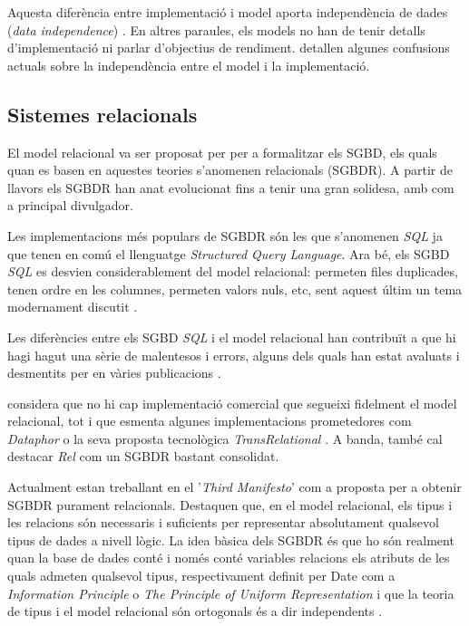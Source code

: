 Aquesta diferència entre implementació i model aporta independència de dades (\emph{data independence}) \parencite{date:dictionary}. En altres paraules, els models no han de tenir detalls d'implementació ni parlar d'objectius de rendiment. 
\textcite{dbdebunk} detallen algunes confusions actuals sobre la independència entre el model i la implementació.







\subsection{Sistemes relacionals}

El model relacional va ser proposat per \textcite{codd70} per a
formalitzar els SGBD, els quals quan es basen en aquestes teories
s'anomenen relacionals (SGBDR). A partir de llavors els SGBDR han anat
evolucionat fins a tenir una gran solidesa, amb
\textcite{date:introduction,date06,date:dictionary} com a principal
divulgador.



Les implementacions més populars de SGBDR són les que s'anomenen
\emph{SQL} ja que tenen en comú el llenguatge \emph{Structured Query
  Language}. Ara bé, els SGBD \emph{SQL} es desvien considerablement
del model relacional: permeten files duplicades, tenen ordre en les
columnes, permeten valors nuls, etc, sent aquest últim un tema
modernament discutit \parencite{date08:nulls}.

Les diferències entre els SGBD \emph{SQL} i el model relacional han
contribuït a que hi hagi hagut una sèrie de malentesos i
errors, alguns dels quals han estat avaluats i desmentits per
\citeauthor{dbdebunk} en vàries
publicacions \parencite{dbdebunk,date06}.
  

\textcite[cap.~2]{date06} %
considera que no hi cap implementació comercial que segueixi fidelment
el model relacional, tot i que esmenta algunes implementacions
prometedores com \emph{Dataphor} o la seva proposta tecnològica
\emph{TransRelational} \parencite{date:transrelational}. A banda,
també cal destacar \emph{Rel} \parencite{rel} com un SGBDR bastant
consolidat.



Actualment \textcite{date:thethirdmanifesto} estan treballant en el
'\emph{Third Manifesto}' com a proposta per a obtenir SGBDR purament
relacionals. Destaquen que, en el model relacional, els tipus i les
relacions són necessaris i suficients per representar absolutament
qualsevol tipus de dades a nivell lògic. %
La idea bàsica dels SGBDR és que ho són realment quan la base de dades conté i només conté variables relacions els atributs de les quals admeten qualsevol tipus, respectivament definit per Date com a \emph{Information Principle} o \emph{The Principle of Uniform Representation} \parencite{date:dictionary} i que la teoria de tipus i el model relacional són ortogonals és a dir independents \parencite[cap.~6]{date06}.

